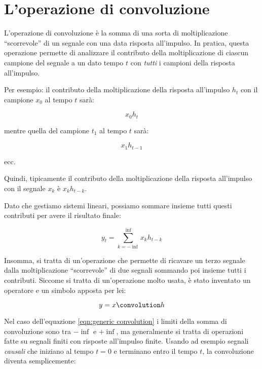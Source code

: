 %
%

\section{L'operazione di convoluzione\label{sec:convolution}}

L'operazione di convoluzione \`e la somma di una sorta di moltiplicazione
``scorrevole'' di un segnale con una data risposta all'impulso.
In pratica, questa operazione permette di analizzare il contributo della
moltiplicazione di ciascun campione del segnale
a un dato tempo $t$
con \emph{tutti} i campioni della risposta all'impulso.

Per esempio: il contributo della moltiplicazione della
risposta all'impulso $h_t$ con il campione $x_0$ al tempo $t$ sar\`a:

\begin{equation}
  x_0 h_t
\end{equation}

mentre quella del campione $t_1$ al tempo $t$ sar\`a:

\begin{equation}
  x_1 h_{t-1}
\end{equation}

ecc.

Quindi, tipicamente il contributo della moltiplicazione della risposta
all'impulso con il segnale $x_k$ \`e $x_k h_{t-k}$.

Dato che gestiamo sistemi lineari, possiamo sommare insieme tutti questi
contributi per avere il risultato finale:

\begin{equation}\label{eqn:generic convolution}
  y_t = \sum_{k = -\inf}^{\inf}{x_k h_{t-k}}
\end{equation}

Insomma, si tratta di un'operazione che permette di ricavare un terzo segnale
dalla moltiplicazione ``scorrevole'' di due segnali sommando poi insieme tutti
i contributi. Siccome si tratta di un'operazione molto usata, \`e stato
inventato un operatore e un simbolo apposta per lei:

\begin{equation}
  y = x \convolution h
\end{equation}

Nel caso dell'equazione \vref{eqn:generic convolution} i limiti della somma di
convoluzione sono tra $-\inf$ e $+\inf$, ma generalmente si tratta di
operazioni fatte su segnali finiti con risposte all'impulso finite. Usando ad
esempio segnali \emph{causali} che iniziano al tempo $t = 0$ e terminano entro
il tempo $t$, la convoluzione diventa semplicemente:


